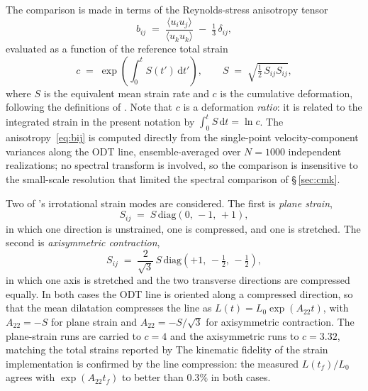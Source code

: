 \documentclass[lineno]{JFM-FLM_Au}
\begin{document}
The comparison is made in terms of the Reynolds-stress anisotropy tensor
\begin{equation}
  b_{ij} \;=\; \frac{\langle u_i u_j\rangle}{\langle u_k u_k\rangle}
              \;-\; \tfrac{1}{3}\,\delta_{ij},
  \label{eq:bij}
\end{equation}
evaluated as a function of the reference total strain
\begin{equation}
  c \;=\; \exp\!\left(\int_0^t S(t')\,\mathrm{d}t'\right),
  \qquad
  S \;=\; \sqrt{\tfrac{1}{2}\,S_{ij}S_{ij}},
  \label{eq:total-strain}
\end{equation}
where $S$ is the equivalent mean strain rate and $c$ is the cumulative
deformation, following the definitions of \citet[][Eqs.~5.1.4 and
5.1.7]{LeeReynolds1985}. Note that $c$ is a deformation \emph{ratio}: it is
related to the integrated strain in the present notation by
$\int_0^t S\,\mathrm{d}t = \ln c$. The anisotropy~\eqref{eq:bij} is computed
directly from the single-point velocity-component variances along the ODT line,
ensemble-averaged over $N=1000$ independent realizations; no spectral transform
is involved, so the comparison is insensitive to the small-scale resolution that
limited the spectral comparison of \S\,\ref{sec:cmk}.

Two of \citeauthor{LeeReynolds1985}'s irrotational strain modes are considered.
The first is \emph{plane strain},
\begin{equation}
  S_{ij} \;=\; S\,\mathrm{diag}(0,\,-1,\,+1),
  \label{eq:lr-plane-strain}
\end{equation}
in which one direction is unstrained, one is compressed, and one is stretched.
The second is \emph{axisymmetric contraction},
\begin{equation}
  S_{ij} \;=\; \frac{2}{\sqrt{3}}\,S\,
  \mathrm{diag}\!\left(+1,\,-\tfrac{1}{2},\,-\tfrac{1}{2}\right),
  \label{eq:axisym-contraction}
\end{equation}
in which one axis is stretched and the two transverse directions are compressed
equally. In both cases the ODT line is oriented along a compressed direction, so
that the mean dilatation compresses the line as $L(t)=L_0\exp(A_{22}t)$, with
$A_{22}=-S$ for plane strain and $A_{22}=-S/\sqrt{3}$ for axisymmetric
contraction. The plane-strain runs are carried to $c=4$ and the axisymmetric runs
to $c=3.32$, matching the total strains reported by \citeauthor{LeeReynolds1985}
The kinematic fidelity of the strain implementation is confirmed by the line
compression: the measured $L(t_f)/L_0$ agrees with $\exp(A_{22}t_f)$ to better
than $0.3\%$ in both cases.
\end{document}

